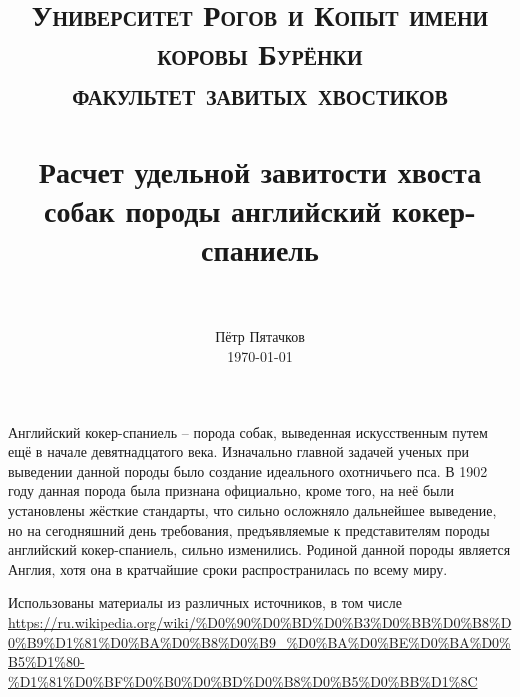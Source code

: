 \documentclass[paper=a4, fontsize=12pt]{scrartcl}
\title{
        \usefont{OT1}{bch}{b}{n}
        \normalfont \normalsize \textsc{Университет Рогов и Копыт имени коровы Бурёнки} \\
        \normalfont \normalsize \textsc{факультет завитых хвостиков} \\ [20pt]
        \horrule{0.5pt} \\[0.4cm]
        \huge Расчет удельной завитости хвоста собак породы английский кокер-спаниель \\
        \horrule{2pt} \\[0.3cm]
}
\author{
        \normalfont \normalsize Пётр Пятачков \\[-3pt]      
        \normalsize \today
}
\date{}
\begin{document}
\maketitle

Английский кокер-спаниель -- порода собак, выведенная искусственным путем ещё в начале девятнадцатого века. Изначально главной задачей ученых при выведении данной породы было создание идеального охотничьего пса. В 1902 году данная порода была признана официально, кроме того, на неё были установлены жёсткие стандарты, что сильно осложняло дальнейшее выведение, но на сегодняшний день требования, предъявляемые к представителям породы английский кокер-спаниель, сильно изменились. Родиной данной породы является Англия, хотя она в кратчайшие сроки распространилась по всему миру.


\vfill \small Использованы материалы из различных источников, в том числе \url{https://ru.wikipedia.org/wiki/%D0%90%D0%BD%D0%B3%D0%BB%D0%B8%D0%B9%D1%81%D0%BA%D0%B8%D0%B9_%D0%BA%D0%BE%D0%BA%D0%B5%D1%80-%D1%81%D0%BF%D0%B0%D0%BD%D0%B8%D0%B5%D0%BB%D1%8C}


\end{document}
